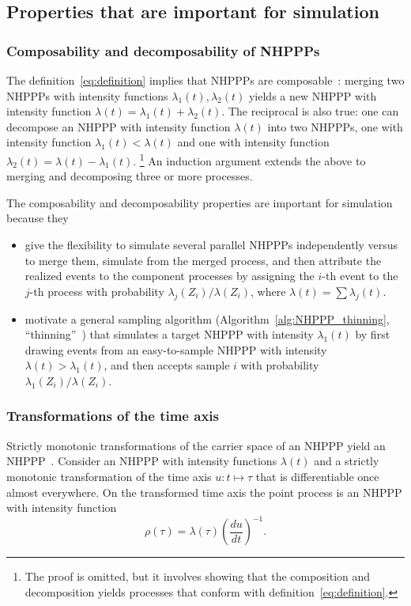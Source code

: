 \documentclass[article,nojss]{jss}\usepackage[]{graphicx}\usepackage[]{xcolor}
\newcommand{\der}[2]{\frac{d {#1}} {d{#2}}}
\begin{document}
\subsection{Properties that are important for simulation}\label{sec:properties}
\subsubsection{Composability and decomposability of NHPPPs}
The definition~\eqref{eq:definition} implies that NHPPPs are composable~\citep[par. 4.2]{cox1965theory}: merging two NHPPPs with intensity functions $\lambda_1(t), \lambda_2(t)$ yields a new NHPPP with intensity function $\lambda(t) = \lambda_1(t) + \lambda_2(t)$. The reciprocal is also true: one can decompose an NHPPP with intensity function $\lambda(t)$ into two NHPPPs, one with intensity function $\lambda_1(t) < \lambda(t)$ and one with intensity function ${\lambda_2(t) = \lambda(t)-\lambda_1(t)}$.%
\footnote{The proof is omitted, but it involves showing that the composition and decomposition yields processes that conform with definition~\eqref{eq:definition}.} An induction argument extends the above to merging and decomposing three or more processes.

The composability and decomposability properties are important for simulation because they
\begin{itemize}
    \item give the flexibility to simulate several parallel NHPPPs independently versus to merge them, simulate from the merged process, and then attribute the realized events to the component processes by assigning the $i$-th event to the $j$-th process with probability $\lambda_j(Z_i) / \lambda(Z_i)$, where $\lambda(t) = \sum \lambda_j(t)$.
    \item motivate a general sampling algorithm (Algorithm~\ref{alg:NHPPP_thinning}, ``thinning''~\citep{lewis1979thinning}) that simulates a target NHPPP with intensity $\lambda_1(t)$ by first drawing events from an easy-to-sample NHPPP with intensity $\lambda(t) >\lambda_1(t)$, and then accepts sample $i$ with probability $\lambda_1(Z_i)/\lambda(Z_i)$.
\end{itemize}

\subsubsection{Transformations of the time axis}
Strictly monotonic transformations of the carrier space of an NHPPP yield an NHPPP~\citep[]{Cinlar1975inversion}. Consider an NHPPP with intensity functions $\lambda(t)$ and a strictly monotonic transformation of the time axis $u: t \mapsto \tau$ that is differentiable once almost everywhere. On the transformed time axis the point process is an NHPPP with intensity function
\begin{equation}\label{eq:transform}
    \rho(\tau) = \lambda(\tau) \left ( \der{u}{t} \right )^{-1}.
\end{equation}
\end{document}
